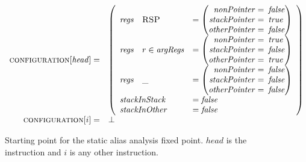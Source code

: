 \begin{figure}
  \begin{displaymath}
    \begin{array}{rl}
      \textsc{configuration}[\mathit{head}] = & \left(\begin{array}{lll}
        \mathit{regs} & \textsc{RSP} & = \left(\begin{array}{rl}
          \mathit{nonPointer} = &\!\!\!\mathit{false}\!\!\!\\
          \!\!\!\mathit{stackPointer} = &\!\!\!\mathit{true}\!\!\!\\
          \!\!\!\mathit{otherPointer} = &\!\!\!\mathit{false}\!\!\!
        \end{array}\right)\\
        \mathit{regs} & r \in \mathit{argRegs} & = \left(\begin{array}{rl}
          \mathit{nonPointer} = &\!\!\!\mathit{true}\!\!\!\\
          \!\!\!\mathit{stackPointer} = &\!\!\!\mathit{false}\!\!\!\\
          \!\!\!\mathit{otherPointer} = &\!\!\!\mathit{true}\!\!\!
        \end{array}\right)\\
        \mathit{regs} & \_ & = \left(\begin{array}{rl}
          \mathit{nonPointer} = &\!\!\!\mathit{false}\!\!\!\\
          \!\!\!\mathit{stackPointer} = &\!\!\!\mathit{false}\!\!\!\\
          \!\!\!\mathit{otherPointer} = &\!\!\!\mathit{false}\!\!\!
        \end{array}\right)\\
        \multicolumn{2}{l}{\mathit{stackInStack}} & = \mathit{false}\\
        \multicolumn{2}{l}{\mathit{stackInOther}} & = \mathit{false}\\
      \end{array}\right)\\
      \textsc{configuration}[i] = & \bot\\
    \end{array}
  \end{displaymath}
  \caption{Starting point for the static alias analysis fixed point.
    $\mathit{head}$ is the  instruction and $i$
    is any other instruction.}
  \label{fig:static_alias:initial_config}
\end{figure}

